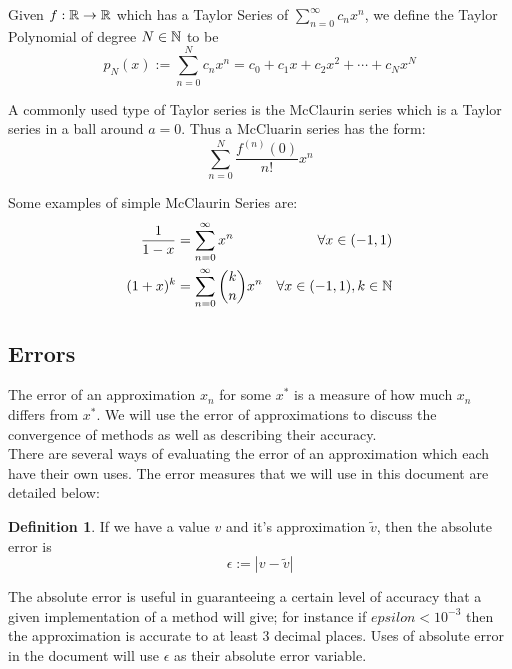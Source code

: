 \begin{Taylor Polynomial}
\label{DEF_"Taylor Polynomial"}
Given \(f : \mathbb{R} \to \mathbb{R}\) which has a Taylor Series of
\( \sum_{n=0}^\infty c_n x^n \), we define the Taylor Polynomial of degree \(N \in \mathbb{N}\) to be
\[ p_N(x) := \sum_{n=0}^N c_n x^n = c_0 + c_1 x + c_2 x^2 + \dotsb + c_N x^N\]
\end{Taylor Polynomial}

A commonly used type of Taylor series is the McClaurin series which is a Taylor series in a ball around \(a = 0\). Thus a McCluarin series has the form:
\[\sum_{n=0}^N \frac{f^{(n)}(0)}{n!}x^n\]

Some examples of simple McClaurin Series are:
\begin{align*}
\frac{1}{1-x} &= \sum_{n=0}^\infty x^n &\forall x \in {({-1},1)}\\
(1 + x)^k	  &= \sum_{n=0}^\infty \binom{k}{n} x^n 
					&\forall x \in (-1,1), k \in \mathbb{N}
\end{align*}

\subsection{Errors}
\label{SUB_"Error Definitions"}
\theoremstyle{definition}
\newtheorem{Absolute Error}{Definition}[subsection]
\newtheorem{Iteration Error}[Absolute Error]{Definition}

The error of an approximation \(x_n\) for some \(x^\ast\) is a measure of how much \(x_n\) differs from \(x^\ast\). We will use the error of approximations to discuss the convergence of methods as well as describing their accuracy.\\

There are several ways of evaluating the error of an approximation which each have their own uses. The error measures that we will use in this document are detailed below:

\begin{Absolute Error}
\label{DEF_"Absolute Error"}
If we have a value \(v\) and it's approximation \(\tilde{v}\), then the absolute error is
\[ \epsilon := \left| v - \tilde{v} \right| \]
\end{Absolute Error}

The absolute error is useful in guaranteeing a certain level of accuracy that a given implementation of a method will give; for instance if \(epsilon < 10^{-3}\) then the approximation is accurate to at least 3 decimal places. Uses of absolute error in the document will use \(\epsilon\) as their absolute error variable.

